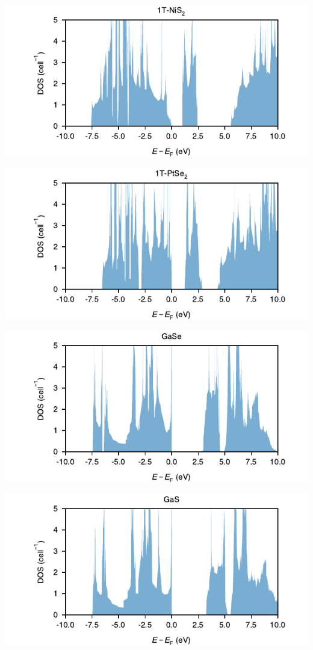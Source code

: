 \begin{center}
\includegraphics[width=.9\linewidth]{img/SI_figs/1T-NiS2-DOS.pdf}
\end{center}
\begin{center}
\includegraphics[width=.9\linewidth]{img/SI_figs/1T-PtSe2-DOS.pdf}
\end{center}
\begin{center}
\includegraphics[width=.9\linewidth]{img/SI_figs/GaSe-DOS.pdf}
\end{center}
\begin{center}
\includegraphics[width=.9\linewidth]{img/SI_figs/GaS-DOS.pdf}
\end{center}

